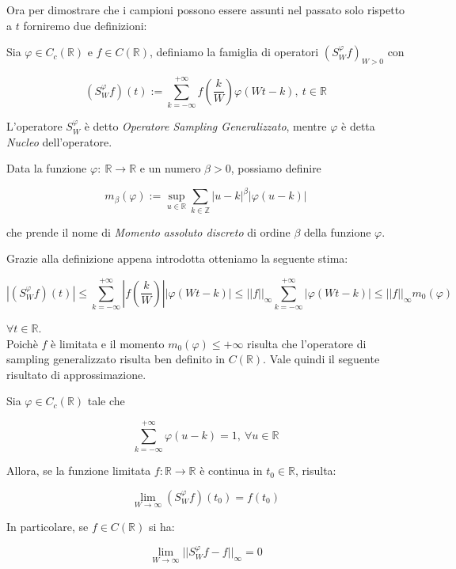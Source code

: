 Ora per dimostrare che i campioni possono essere assunti nel passato solo rispetto
a $t$ forniremo due definizioni:

\begin{definition}
    Sia $\varphi \in C_c(\mathbb{R})$ e $f \in C(\mathbb{R})$, definiamo la famiglia
    di operatori $(S_W^{\varphi}f)_{W>0}$ con

    $$
        (S_W^{\varphi}f)(t) := \sum_{k = - \infty}^{+\infty} f(\frac{k}{W}) \varphi(Wt-k), \ t \in \mathbb{R}
    $$
\end{definition}

L'operatore $S_W^{\varphi}$ è detto \textit{Operatore Sampling Generalizzato}, mentre
$\varphi$ è detta \textit{Nucleo} dell'operatore.

\begin{definition}
    Data la funzione $\varphi: \ \mathbb{R} \rightarrow \mathbb{R}$ e un numero
    $\beta > 0$, possiamo definire

    $$
        m_\beta(\varphi) := \sup_{u \in \mathbb{R}} \sum_{k \in \mathbb{Z}} |u-k|^\beta |\varphi(u-k)|
    $$

    che prende il nome di \textit{Momento assoluto discreto} di ordine $\beta$ della funzione
    $\varphi$.
\end{definition}

Grazie alla definizione appena introdotta otteniamo la seguente stima:

$$
    |(S_W^{\varphi}f)(t)| \leq \sum_{k = - \infty}^{+\infty} |f(\frac{k}{W})| |\varphi(Wt-k)| \leq ||f||_{\infty} \sum_{k = - \infty}^{+\infty} |\varphi(Wt-k)| \leq ||f||_{\infty} m_0(\varphi)
$$

$\forall t \in \mathbb{R}$.\\

Poichè $f$ è limitata e il momento $m_0(\varphi) \leq +\infty$ risulta che
l'operatore di sampling generalizzato risulta ben definito in $C(\mathbb{R})$.
Vale quindi il seguente risultato di approssimazione.

\begin{theorem}
    Sia $\varphi \in C_c(\mathbb{R})$ tale che

    \begin{equation}\label{eq:uno}
        \sum_{k = - \infty}^{+\infty} \varphi(u-k) = 1, \ \forall u \in \mathbb{R}
    \end{equation}

    Allora, se la funzione limitata $f: \mathbb{R} \rightarrow \mathbb{R}$ è continua
    in $t_0 \in \mathbb{R}$, risulta:

    $$
        \lim_{W \rightarrow \infty} (S_W^{\varphi}f)(t_0) = f(t_0)
    $$

    In particolare, se $f \in C(\mathbb{R})$ si ha:

    $$
        \lim_{W \rightarrow \infty} ||S_W^{\varphi}f - f||_\infty = 0
    $$
\end{theorem}

